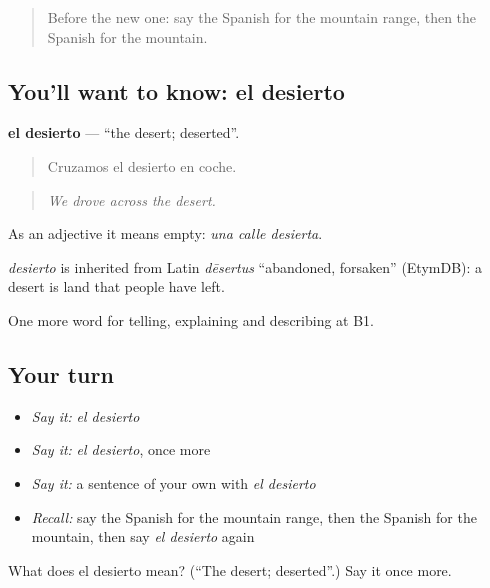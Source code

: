 \label{lesson:ES-C685-desierto}



\begin{quote}
Before the new one: say the Spanish for the mountain range, then the Spanish for the mountain.
\end{quote}

\subsection*{You'll want to know: el desierto}
\textbf{el desierto} — \textquotedblleft{}the desert; deserted\textquotedblright{}.

\begin{quote}
Cruzamos el desierto en coche.
\end{quote}

\begin{quote}
\emph{We drove across the desert.}
\end{quote}

As an adjective it means empty: \emph{una calle desierta}.

\begin{cousinweb}
\emph{desierto} is inherited from Latin \emph{dēsertus} \textquotedblleft{}abandoned, forsaken\textquotedblright{} (EtymDB): a desert is land that people have left.
\end{cousinweb}

\begin{grammarlens}[title={What you've built}]
One more word for telling, explaining and describing at B1.
\end{grammarlens}

\subsection*{Your turn}
\begin{itemize}
\raggedright
  \item \emph{Say it:} \emph{el desierto}
  \item \emph{Say it:} \emph{el desierto}, once more
  \item \emph{Say it:} a sentence of your own with \emph{el desierto}
  \item \emph{Recall:} say the Spanish for the mountain range, then the Spanish for the mountain, then say \emph{el desierto} again
\end{itemize}

\begin{tcolorbox}[breakable,colback=teal!4,colframe=teal!35!black,title={Before you move on}]
What does el desierto mean? (\textquotedblleft{}The desert; deserted\textquotedblright{}.) Say it once more.
\end{tcolorbox}
